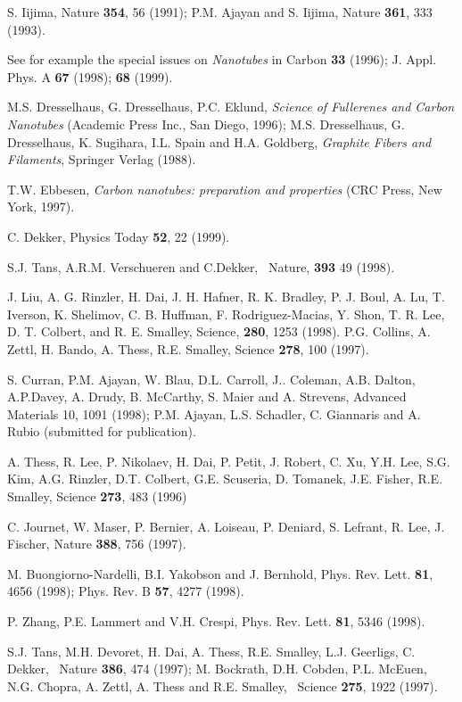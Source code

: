 \begin{multicols}{2}
\begin{thebibliography}{99}
 S. Iijima, Nature {\bf 354}, 56 (1991); P.M. Ajayan and S.
Iijima, Nature {\bf 361}, 333 (1993).

 See for example the special issues on {\it Nanotubes} in
Carbon {\bf 33} (1996); J. Appl. Phys. A {\bf 67} (1998); {\bf 68} (1999).

 M.S. Dresselhaus, G. Dresselhaus, P.C. Eklund, {\it Science
of Fullerenes and Carbon Nanotubes} (Academic Press Inc., San Diego, 1996);
M.S. Dresselhaus, G. Dresselhaus, K. Sugihara, I.L. Spain and H.A. Goldberg,
{\it Graphite Fibers and Filaments}, Springer Verlag (1988).

 T.W. Ebbesen, {\it Carbon nanotubes: preparation and
properties} (CRC Press, New York, 1997).

 C. Dekker, Physics Today {\bf 52}, 22 (1999).

S.J. Tans, A.R.M. Verschueren and C.Dekker, {\ Nature}, {\bf 393} 49 (1998).

 J. Liu, A. G. Rinzler, H. Dai, J. H. Hafner, R. K. Bradley, P.
J. Boul, A. Lu, T. Iverson, K. Shelimov, C. B. Huffman, F.
Rodriguez-Macias, Y. Shon, T. R. Lee, D. T. Colbert, and R. E.
Smalley, Science, {\bf 280}, 1253 (1998). P.G. Collins, A. Zettl,
H. Bando, A. Thess, R.E. Smalley, Science {\bf 278}, 100 (1997).

 S. Curran, P.M. Ajayan, W. Blau, D.L.
Carroll, J.. Coleman, A.B. Dalton, A.P.Davey, A. Drudy, B. McCarthy, S.
Maier and A. Strevens, Advanced Materials 10, 1091 (1998); 
P.M. Ajayan, L.S. Schadler, C. Giannaris and A. Rubio 
(submitted for publication).

 A. Thess, R. Lee, P. Nikolaev, H. Dai, P. Petit, J.
Robert, C. Xu, Y.H. Lee, S.G. Kim, A.G. Rinzler, D.T. Colbert, G.E.
Scuseria, D. Tomanek, J.E. Fisher, R.E. Smalley, Science {\bf 273}, 483
(1996)

 C. Journet, W. Maser, P. Bernier, A. Loiseau, P.
Deniard, S. Lefrant, R. Lee, J. Fischer, Nature {\bf 388}, 756 (1997).

 M. Buongiorno-Nardelli, B.I. Yakobson and J. Bernhold,
Phys. Rev. Lett. {\bf 81}, 4656 (1998); Phys. Rev. B {\bf 57}, 4277 (1998).

 P. Zhang, P.E. Lammert and V.H. Crespi, Phys. Rev. Lett.
{\bf 81}, 5346 (1998).

 S.J. Tans, M.H. Devoret, H. Dai, A. Thess, R.E. Smalley,
L.J. Geerligs, C. Dekker, {\ Nature} {\bf 386}, 474 (1997); M.
Bockrath, D.H. Cobden, P.L. McEuen, N.G. Chopra, A. Zettl, A.
Thess and R.E. Smalley, {\ Science} {\bf 275}, 1922 (1997).


\end{thebibliography}
\end{multicols}
